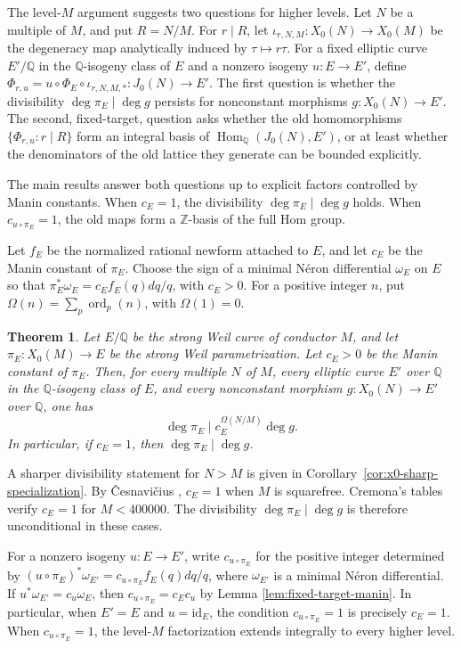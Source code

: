 \documentclass[12pt, letterpaper]{amsart}
\newtheorem{theorem}{Theorem}[section]
\theoremstyle{definition}
\theoremstyle{remark}
\newcommand{\Q}{\mathbb Q}
\newcommand{\Z}{\mathbb Z}
\newcommand{\Hom}{\operatorname{Hom}}
\DeclareMathOperator{\ord}{ord}
\numberwithin{equation}{section}
\begin{document}
The level-\(M\) argument suggests two questions for higher levels. Let \(N\) be a
multiple of \(M\), and put \(R=N/M\). For \(r\mid R\), let
\(\iota_{r,N,M}:X_0(N)\to X_0(M)\) be the degeneracy map analytically induced by
\(\tau\mapsto r\tau\). For a fixed elliptic curve \(E'/\Q\) in the
\(\Q\)-isogeny class of \(E\) and a nonzero isogeny \(u:E\to E'\), define
\(\Phi_{r,u}=u\circ\Phi_E\circ\iota_{r,N,M,*}:J_0(N)\to E'\).
The first question is whether the divisibility \(\deg\pi_E\mid\deg g\) persists
for nonconstant morphisms \(g:X_0(N)\to E'\). The second, fixed-target, question
asks whether the old homomorphisms \(\{\Phi_{r,u}:r\mid R\}\) form an integral
basis of \(\Hom_\Q(J_0(N),E')\), or at least whether the denominators of the old
lattice they generate can be bounded explicitly.

The main results answer both questions up to explicit factors controlled by
Manin constants. When \(c_E=1\), the divisibility
\(\deg\pi_E\mid\deg g\) holds. When \(c_{u\circ\pi_E}=1\), the old maps form
a \(\Z\)-basis of the full Hom group.

Let \(f_E\) be the normalized rational newform attached to \(E\), and let
\(c_E\) be the Manin constant of \(\pi_E\). Choose the sign of a minimal
N\'eron differential \(\omega_E\) on \(E\) so that
\(\pi_E^*\omega_E=c_E f_E(q)dq/q\), with \(c_E>0\).
For a positive integer \(n\), put \(\Omega(n)=\sum_p\ord_p(n)\), with
\(\Omega(1)=0\).

\begin{theorem}\label{thm:main}
Let \(E/\Q\) be the strong Weil curve of conductor \(M\), and let
\(\pi_E:X_0(M)\to E\) be the strong Weil parametrization. Let \(c_E>0\) be the
Manin constant of \(\pi_E\). Then, for every multiple \(N\) of \(M\), every
elliptic curve \(E'\) over \(\Q\) in the \(\Q\)-isogeny class of \(E\), and every
nonconstant morphism \(g:X_0(N)\to E'\) over \(\Q\), one has
\[
        \deg\pi_E\mid c_E^{\Omega(N/M)}\deg g.
\]
In particular, if \(c_E=1\), then \(\deg\pi_E\mid\deg g\).
\end{theorem}

A sharper divisibility statement for \(N>M\) is given in
Corollary~\ref{cor:x0-sharp-specialization}.
By \v{C}esnavi\v{c}ius \cite{CesnaviciusManinSemistable},
\(c_E=1\) when \(M\) is squarefree. Cremona's tables
\cite{CremonaData} verify \(c_E=1\) for \(M<400000\).
The divisibility \(\deg\pi_E\mid\deg g\) is therefore unconditional in these cases.

For a nonzero isogeny \(u:E\to E'\), write \(c_{u\circ\pi_E}\) for the positive
integer determined by
\((u\circ\pi_E)^*\omega_{E'}=c_{u\circ\pi_E}f_E(q)dq/q\), where
\(\omega_{E'}\) is a minimal N\'eron differential. If
\(u^*\omega_{E'}=c_u\omega_E\), then
\(c_{u\circ\pi_E}=c_Ec_u\) by Lemma \ref{lem:fixed-target-manin}. In particular,
when \(E'=E\) and \(u=\mathrm{id}_E\), the condition
\(c_{u\circ\pi_E}=1\) is precisely \(c_E=1\). When
\(c_{u\circ\pi_E}=1\), the level-\(M\) factorization extends integrally to every
higher level.
\end{document}

